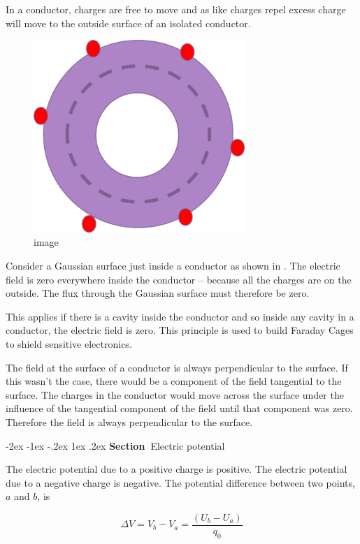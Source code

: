 \documentclass[
]{book}
\makeatletter
\renewcommand\section{%
\@startsection{section}{1}{\z@}%
              {-2ex \@plus -1ex \@minus -.2ex}%
              {1ex \@plus .2ex}%
              {\sffamily\bfseries\large\noindent Section~}}
\numberwithin{equation}{section}
\makeatother
\begin{document}
In a conductor, charges are free to move and as like charges repel
excess charge will move to the outside surface of an isolated conductor.

\begin{figure}
\centering
\includegraphics[width=80mm,height=\textheight]{Figures/GaussInsideShell.png}
\caption{image}
\end{figure}

Consider a Gaussian surface just inside a conductor as shown in . The
electric field is zero everywhere inside the conductor -- because all
the charges are on the outside. The flux through the Gaussian surface
must therefore be zero.

This applies if there is a cavity inside the conductor and so inside any
cavity in a conductor, the electric field is zero. This principle is
used to build Faraday Cages to shield sensitive electronics.

The field at the surface of a conductor is always perpendicular to the
surface. If this wasn't the case, there would be a component of the
field tangential to the surface. The charges in the conductor would move
across the surface under the influence of the tangential component of
the field until that component was zero. Therefore the field is always
perpendicular to the surface.

\hypertarget{electric-potential}{%
\section{Electric potential}\label{electric-potential}}

The electric potential due to a positive charge is positive. The
electric potential due to a negative charge is negative. The potential
difference between two points, \(a\) and \(b\), is

\begin{equation}
\label{eq:DeltaV}
\Delta V = V_b - V_a =\frac{(U_b - U_a)}{q_0}   
\end{equation}
\end{document}
